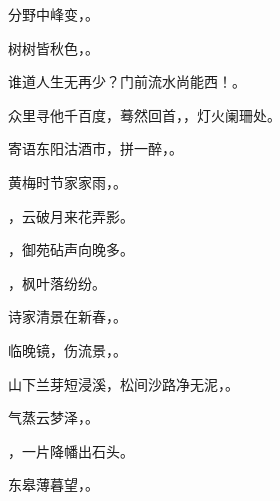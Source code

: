\documentclass[12pt, a4paper, addpoints, answers]{exam}
\begin{document}
\begin{questions}
\question[3] 分野中峰变，\fillin 。

   

 

\question[3] 树树皆秋色，\fillin 。

   

 

\question[3] 谁道人生无再少？门前流水尚能西！\fillin 。

   

 

\question[3] 众里寻他千百度，蓦然回首，\fillin ，灯火阑珊处。

   

 

\question[3] 寄语东阳沽酒市，拼一醉，\fillin 。

   

 

\question[3] 黄梅时节家家雨，\fillin 。

   

 

\question[3] \fillin ，云破月来花弄影。

   

 

\question[3] \fillin ，御苑砧声向晚多。

   

 

\question[3] \fillin ，枫叶落纷纷。

   

 

\question[3] 诗家清景在新春，\fillin 。

   

 

\question[3] 临晚镜，伤流景，\fillin 。

   

 

\question[3] 山下兰芽短浸溪，松间沙路净无泥，\fillin 。

   

 

\question[3] 气蒸云梦泽，\fillin 。

   

 

\question[3] \fillin ，一片降幡出石头。

   

 

\question[3] 东皋薄暮望，\fillin 。

   

 


\end{questions}
\end{document}
